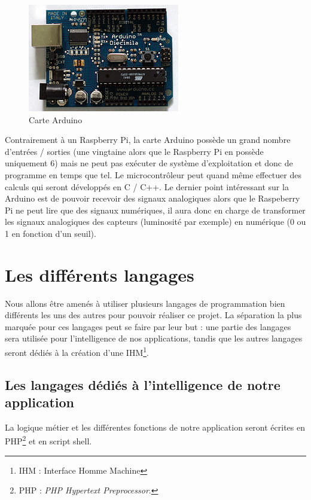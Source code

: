 \documentclass[a4paper, 12pt, french]{article}
\begin{document}
\begin{figure}
  	\centering
  	\includegraphics[scale= 0.6]{Arduino.jpg}
  	\caption{Carte Arduino}
\end{figure}

Contrairement à un Raspberry Pi, la carte Arduino possède un grand nombre d'entrées / sorties (une vingtaine alors que le Raspberry Pi en possède uniquement 6) mais ne peut pas exécuter de système d'exploitation et donc de programme en temps que tel. Le microcontrôleur peut quand même effectuer des calculs qui seront développés en C / C++. Le dernier point intéressant sur la Arduino est de pouvoir recevoir des signaux analogiques alors que le Raspeberry Pi ne peut lire que des signaux numériques, il aura donc en charge de transformer les signaux analogiques des capteurs (luminosité par exemple) en numérique (0 ou 1 en fonction d'un seuil). \\




\pagebreak
\section{Les différents langages} %
\label{sec:les_diff_rents_langages}
Nous allons être amenés à utiliser plusieurs langages de programmation bien différents les uns des autres pour pouvoir réaliser ce projet. La séparation la plus marquée pour ces langages peut se faire par leur but : une partie des langages sera utilisée pour l'intelligence de nos applications, tandis que les autres langages seront dédiés à la création d'une IHM\footnote{IHM : Interface Homme Machine}.

\subsection{Les langages dédiés à l'intelligence de notre application}
La logique métier et les différentes fonctions de notre application seront écrites en PHP\footnote{PHP : \textit{PHP Hypertext Preprocessor}.} et en script shell.\\
\end{document}

